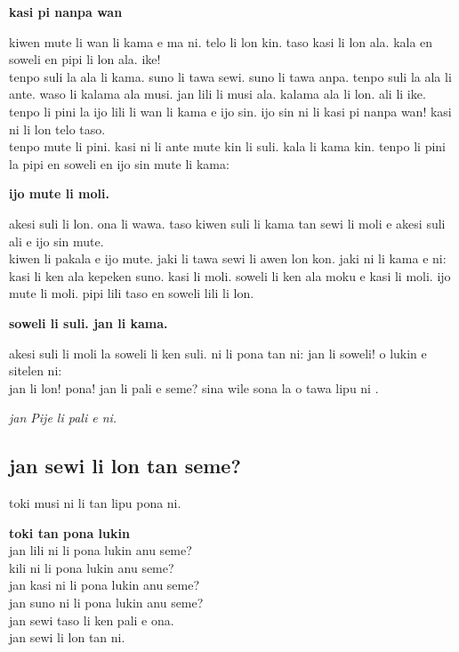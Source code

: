 \textbf{kasi pi nanpa wan} 

kiwen mute li wan li kama e ma ni. telo li lon kin. taso kasi li lon ala. kala en soweli en pipi li lon ala. ike! \\
tenpo suli la ala li kama. suno li tawa sewi. suno li tawa anpa. tenpo suli la ala li ante. waso li kalama ala musi. jan lili li musi ala. kalama ala li lon. ali li ike. tenpo li pini la ijo lili li wan li kama e ijo sin. ijo sin ni li kasi pi nanpa wan! kasi ni li lon telo taso. \\
tenpo mute li pini. kasi ni li ante mute kin li suli. kala li kama kin. tenpo li pini la pipi en soweli en ijo sin mute li kama:

\textbf{ijo mute li moli.} 

akesi suli li lon. ona li wawa. taso kiwen suli li kama tan sewi li moli e akesi suli ali e ijo sin mute. \\
kiwen li pakala e ijo mute. jaki li tawa sewi li awen lon kon. jaki ni li kama e ni: kasi li ken ala kepeken suno. kasi li moli. soweli li ken ala moku e kasi li moli. ijo mute li moli. pipi lili taso en soweli lili li lon.

\textbf{soweli li suli. jan li kama.} 

akesi suli li moli la soweli li ken suli. ni li pona tan ni: jan li soweli! o lukin e sitelen ni: \\
jan li lon! pona! jan li pali e seme? sina wile sona la o tawa lipu ni \cite{www:Pije:01}.

\textit{jan Pije li pali e ni. \cite{www:Pije:01}}
%
\newpage
\subsection{jan sewi li lon tan seme?}

toki musi ni li tan lipu pona ni.

\textbf{toki tan pona lukin}   \\
jan lili ni li pona lukin anu seme?   \\
kili ni li pona lukin anu seme?   \\
jan kasi ni li pona lukin anu seme?   \\
jan suno ni li pona lukin anu seme?   \\
jan sewi taso li ken pali e ona.   \\
jan sewi li lon tan ni.

